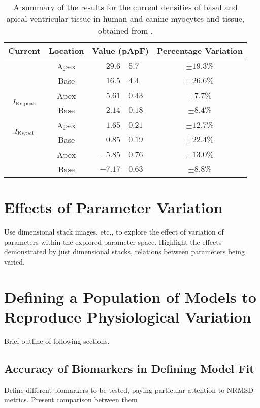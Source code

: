 \documentclass[../thesis-main.tex]{subfiles}
\begin{document}
 \begin{table}
  \centering
  \begin{tabular}{ccr@{$\pm$}lc}
   Current					& Location	& \multicolumn{2}{c}{Value (pApF\super{-1})}	& Percentage Variation	\\
   \hline
   \hline
   \multirow{2}{*}{\ito{}}			& Apex		& $29.6$&$5.7$					& $\pm19.3\%$		\\
						& Base		& $16.5$&$4.4$					& $\pm26.6\%$		\\
   \hline
   \multirow{2}{*}{$I_\textnormal{Ks,peak}$}	& Apex		& $5.61$&$0.43$					& $\pm7.7\%$		\\
						& Base		& $2.14$&$0.18$					& $\pm8.4\%$		\\
   \multirow{2}{*}{$I_\textnormal{Ks,tail}$}	& Apex		& $1.65$&$0.21$					& $\pm12.7\%$		\\
						& Base		& $0.85$&$0.19$					& $\pm22.4\%$		\\
   \hline
   \multirow{2}{*}{\ica{}}			& Apex		& $-5.85$&$0.76$				& $\pm13.0\%$		\\
						& Base		& $-7.17$&$0.63$				& $\pm8.8\%$		\\
  \end{tabular}
  \caption[Summary of current density results from \citet{Szentadrassy2005}.]{A summary of the results for the current densities of basal and apical ventricular tissue in human and canine myocytes and tissue, obtained from \citet{Szentadrassy2005}.}
  \label{table:szentadrassy-results}
 \end{table}
 
 \section{Effects of Parameter Variation}
 \label{sec:param-effects}
 Use dimensional stack images, etc., to explore the effect of variation of parameters within the explored parameter space. Highlight the effects demonstrated by just dimensional stacks, \eg{} relations between parameters being varied.
 
 \section{Defining a Population of Models to Reproduce Physiological Variation}
 \label{sec:population}
 Brief outline of following sections.
 
 \subsection{Accuracy of Biomarkers in Defining Model Fit}
 \label{subsec:model-fit}
 Define different biomarkers to be tested, paying particular attention to NRMSD metrics. Present comparison between them
 
\end{document}
